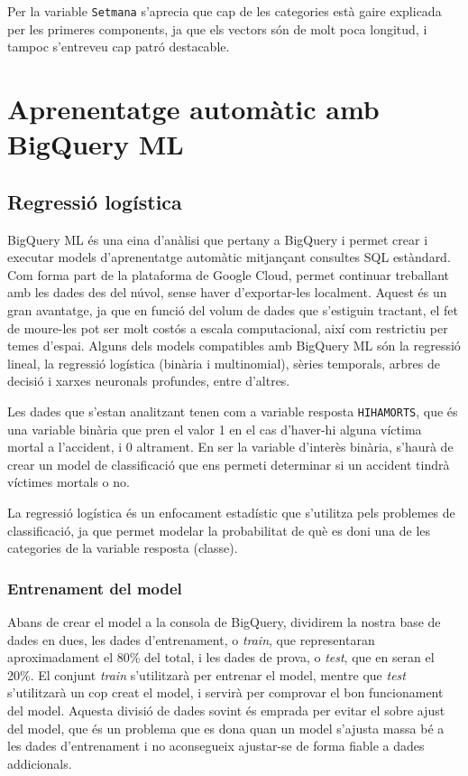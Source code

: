 \documentclass[12pt,longbibliography]{article}
\theoremstyle{definition}
\theoremstyle{remark}
\begin{document}
Per la variable \texttt{Setmana} s'aprecia que cap de les categories està gaire explicada per les primeres components, ja que els vectors són de molt poca longitud, i tampoc s'entreveu cap patró destacable.

\section{Aprenentatge automàtic amb BigQuery ML}

\subsection{Regressió logística}

BigQuery ML és una eina d'anàlisi que pertany a BigQuery i permet crear i executar models d'aprenentatge automàtic mitjançant consultes SQL estàndard. Com forma part de la plataforma de Google Cloud, permet continuar treballant amb les dades des del núvol, sense haver d'exportar-les localment. Aquest és un gran avantatge, ja que en funció del volum de dades que s'estiguin tractant, el fet de moure-les pot ser molt costós a escala computacional, així com restrictiu per temes d'espai. Alguns dels models compatibles amb BigQuery ML són la regressió lineal, la regressió logística (binària i multinomial), sèries temporals, arbres de decisió i xarxes neuronals profundes, entre d'altres.


Les dades que s'estan analitzant tenen com a variable resposta \texttt{HIHAMORTS}, que és una variable binària que pren el valor 1 en el cas d'haver-hi alguna víctima mortal a l'accident, i 0 altrament. En ser la variable d'interès binària, s'haurà de crear un model de classificació que ens permeti determinar si un accident tindrà víctimes mortals o no. 


La regressió logística és un enfocament estadístic que s'utilitza pels problemes de classificació, ja que permet modelar la probabilitat de què es doni una de les categories de la variable resposta (classe).


\subsubsection{Entrenament del model}

Abans de crear el model a la consola de BigQuery, dividirem la nostra base de dades en dues, les dades d'entrenament, o \emph{train}, que representaran aproximadament el 80\% del total, i les dades de prova, o \emph{test}, que en seran el 20\%. El conjunt \emph{train} s'utilitzarà per entrenar el model, mentre que \emph{test} s'utilitzarà un cop creat el model, i servirà per comprovar el bon funcionament del model. Aquesta divisió de dades sovint és emprada per evitar el sobre ajust del model, que és un problema que es dona quan un model s'ajusta massa bé a les dades d'entrenament i no aconsegueix ajustar-se de forma fiable a dades addicionals.
\end{document}
